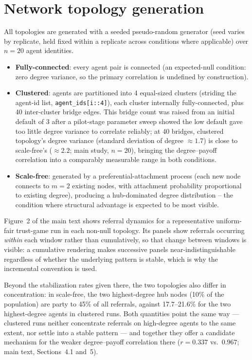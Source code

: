 \documentclass[11pt,a4paper]{article}
\begin{document}
\section{Network topology generation}
\label{sec:s6}

All topologies are generated with a seeded pseudo-random generator
(seed varies by replicate, held fixed within a replicate across
conditions where applicable) over $n=20$ agent identities.

\begin{itemize}[leftmargin=1.5em]
  \item \textbf{Fully-connected}: every agent pair is connected (an
  expected-null condition: zero degree variance, so the primary
  correlation is undefined by construction).
  \item \textbf{Clustered}: agents are partitioned into 4 equal-sized
  clusters (striding the agent-id list, \texttt{agent\_ids[i::4]}),
  each cluster internally fully-connected, plus 40 inter-cluster
  bridge edges. This bridge count was raised from an initial default
  of 3 after a pilot-stage parameter sweep showed the low default gave
  too little degree variance to correlate reliably; at 40 bridges,
  clustered topology's degree variance (standard deviation of degree
  $\approx 1.7$) is close to scale-free's ($\approx 2.2$; main study,
  $n=20$), bringing the degree--payoff correlation into a comparably
  measurable range in both conditions.
  \item \textbf{Scale-free}: generated by a preferential-attachment
  process (each new node connects to $m=2$ existing nodes, with
  attachment probability proportional to existing degree), producing
  a hub-dominated degree distribution -- the condition where
  structural advantage is expected to be most visible.
\end{itemize}

Figure~2 of the main text shows referral dynamics for a representative
uniform-fair trust-game run in each non-null topology. Its panels show
referrals occurring \emph{within} each window rather than
cumulatively, so that change between windows is visible: a cumulative
rendering makes successive panels near-indistinguishable regardless of
whether the underlying pattern is stable, which is why the incremental
convention is used.

Beyond the stabilization rates given there, the two topologies also
differ in concentration: in scale-free, the two highest-degree hub
nodes (10\% of the population) are party to 45\% of all referrals,
against 17.7--21.6\% for the two highest-degree agents in clustered
runs. Both quantities point the same way --- clustered runs neither
concentrate referrals on high-degree agents to the same extent, nor
settle into a stable pattern --- and together they offer a candidate
mechanism for the weaker degree--payoff correlation there ($r=0.337$
vs.\ $0.967$; main text, Sections~4.1 and~5).
\end{document}
